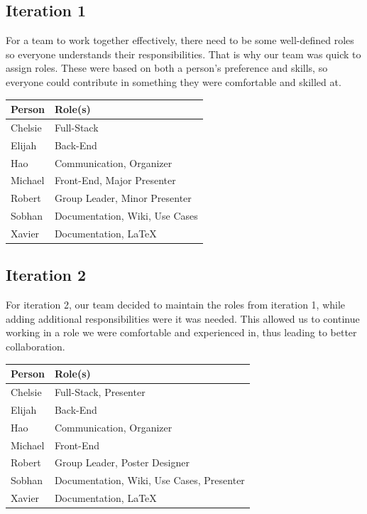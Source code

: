 \documentclass[11pt,onside]{report}
\begin{document}
\subsection{Iteration 1}
For a team to work together effectively, there need to be some well-defined roles so everyone understands their responsibilities. That is why our team was quick to assign roles. These were based on both a person's preference and skills, so everyone could contribute in something they were comfortable and skilled at.
\begin{center}
\begin{tabular}{|l|l|}
    \hline
    \bf{Person} & \bf{Role(s)}  \\
    \hline
    Chelsie & Full-Stack \\
    \hline
    Elijah & Back-End \\
    \hline
    Hao & Communication, Organizer \\
    \hline
    Michael & Front-End, Major Presenter \\
    \hline
    Robert & Group Leader, Minor Presenter \\
    \hline
    Sobhan & Documentation, Wiki, Use Cases \\
    \hline
    Xavier & Documentation, \LaTeX{} \\
    \hline
\end{tabular}
\end{center}

\subsection{Iteration 2}

For iteration 2, our team decided to maintain the roles from iteration 1, while adding additional responsibilities were it was needed. This allowed us to continue working in a role we were comfortable and experienced in, thus leading to better collaboration.

\begin{center}
\begin{tabular}{|l|l|}
    \hline
    \bf{Person} & \bf{Role(s)}  \\
    \hline
    Chelsie & Full-Stack, Presenter \\
    \hline
    Elijah & Back-End \\
    \hline
    Hao & Communication, Organizer \\
    \hline
    Michael & Front-End\\
    \hline
    Robert & Group Leader, Poster Designer \\
    \hline
    Sobhan & Documentation, Wiki, Use Cases, Presenter \\
    \hline
    Xavier & Documentation, \LaTeX{} \\
    \hline
\end{tabular}
\end{center}
\end{document}
